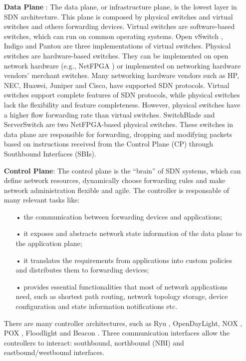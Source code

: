\begin{itemize}
\item[] \textbf{Data Plane} : The data plane, or infrastructure plane, is the lowest layer in SDN architecture. This plane is composed by physical switches and virtual switches and others forwarding devices. Virtual switches are software-based switches, which can run on common operating systems. Open vSwitch \cite{OVS}, Indigo \cite{Indigo} and Pantou \cite{Pantou} are three implementations of virtual switches. Physical switches are hardware-based switches. They can be implemented on open network hardware (e.g., NetFPGA \cite{Lockwood2007}) or implemented on networking hardware vendors’ merchant switches. Many networking hardware vendors such as HP, NEC, Huawei, Juniper and Cisco, have supported SDN protocols. Virtual switches support complete features of SDN protocols, while physical switches lack the flexibility and feature completeness. However, physical switches have a higher flow forwarding rate than virtual switches.  SwitchBlade \cite{Anwer2010} and ServerSwitch \cite{Lu2011} are two NetFPGA-based physical switches.
These switches in data plane are responsible for forwarding, dropping and modifying packets based on instructions received from the Control Plane (CP) through Southbound Interfaces (SBIs).
\item[] \textbf{Control Plane}: The control plane is the “brain” of SDN systems, which can define network resources, dynamically choose forwarding rules and make network administration flexible and agile. The controller is responsable of many relevant tasks like:
\begin{itemize}
\item[•] the communication between forwarding devices and applications;
\item[•] it exposes and abstracts network state information of the data plane to the application plane;
\item[•] it translates the requirements from applications into custom policies and distributes them to forwarding devices;
\item[•] provides essential functionalities that most of network applications need, such as shortest path routing, network topology storage, device configuration and state information notifications etc.
\end{itemize}
There are many controller architectures, such as Ryu \cite{RYU}, OpenDayLight, \cite{Medved2014} NOX \cite{NOX}, POX \cite{POX}, Floodlight \cite{Floodlight} and Beacon \cite{Erickson2013}. Three communication interfaces allow the controllers to interact: southbound, northbound (NBI) and eastbound/westbound interfaces.

\end{itemize}
